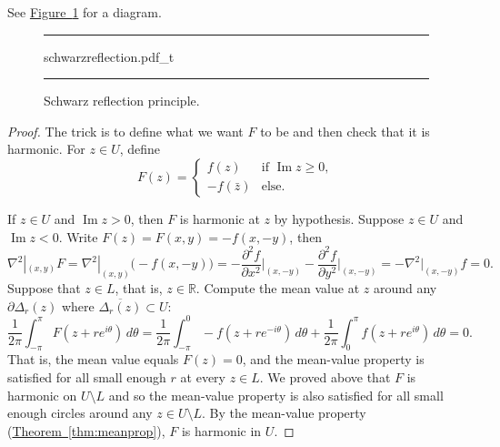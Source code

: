 \documentclass[12pt,openany]{book}
\renewcommand{\Im}{\operatorname{Im}}
\newcommand{\R}{{\mathbb{R}}}
\theoremstyle{plain}
\theoremstyle{remark}
\theoremstyle{definition}
\newenvironment{myfig}{%
\begin{figure}[h!t]
\noindent\rule{\textwidth}{0.5pt}\vspace{12pt}\par\centering}%
{\par\noindent\rule{\textwidth}{0.5pt}
\end{figure}}
\theoremstyle{exercise}
\theoremstyle{example}
\newcommand{\figureref}[1]{\hyperref[#1]{Figure~\ref*{#1}}}
\newcommand{\thmref}[1]{\hyperref[#1]{Theorem~\ref*{#1}}}
\begin{document}
See \figureref{fig:schwarzreflection} for a diagram.

\begin{myfig}
{schwarzreflection.pdf_t}
\caption{Schwarz reflection principle.\label{fig:schwarzreflection}}
\end{myfig}

\begin{proof}
The trick is to define what we want $F$ to be and then
check that it is harmonic.
For $z \in U$, define
\begin{equation*}
F(z) =
\begin{cases}
f(z) & \text{if } \Im z \geq 0, \\
-f(\bar{z}) & \text{else} .
\end{cases}
\end{equation*}

If $z \in U$ and $\Im z > 0$, then $F$ is harmonic at $z$ by hypothesis.
Suppose $z \in U$ and $\Im z < 0$.  Write $F(z) = F(x,y) = -f(x,-y)$, then
\begin{equation*}
\nabla^2|_{(x,y)} F
=
\nabla^2|_{(x,y)} \bigl( -f(x,-y) \bigr)
=
- \frac{\partial^2 f}{\partial x^2}\Big|_{(x,-y)}
- \frac{\partial^2 f}{\partial y^2}\Big|_{(x,-y)}
=
- \nabla^2|_{(x,-y)} f = 0 .
\end{equation*}
Suppose that $z \in L$, that is, $z \in \R$.
Compute the mean value at $z$ around any
$\partial \Delta_r(z)$ where $\overline{\Delta_r(z)} \subset U$:
\begin{equation*}
\frac{1}{2\pi} \int_{-\pi}^{\pi} F(z+re^{i\theta})\, d\theta
=
\frac{1}{2\pi} \int_{-\pi}^{0} -f(z+re^{-i\theta})\, d\theta
+
\frac{1}{2\pi} \int_{0}^{\pi} f(z+re^{i\theta})\, d\theta
=
0 .
\end{equation*}
That is, the mean value equals $F(z) = 0$,
and the mean-value property is satisfied for all small enough
$r$ at every $z \in L$.
We proved above that $F$ is harmonic on $U \setminus L$ and
so the mean-value property
is also satisfied for all small enough circles
around any $z \in U \setminus L$.
By the mean-value property (\thmref{thm:meanprop}), $F$ is harmonic in $U$.
\end{proof}
\end{document}
